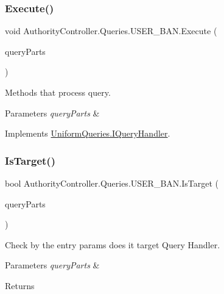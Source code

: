 \subsubsection{\texorpdfstring{Execute()}{Execute()}}
{\footnotesize\ttfamily void Authority\+Controller.\+Queries.\+U\+S\+E\+R\+\_\+\+B\+A\+N.\+Execute (\begin{DoxyParamCaption}\item[{\mbox{\hyperlink{struct_uniform_queries_1_1_query_part}{Query\+Part}} \mbox{[}$\,$\mbox{]}}]{query\+Parts }\end{DoxyParamCaption})}



Methods that process query. 


\begin{DoxyParams}{Parameters}
{\em query\+Parts} & \\
\hline
\end{DoxyParams}


Implements \mbox{\hyperlink{interface_uniform_queries_1_1_i_query_handler_a66d15db03bdd5b0caf6eef96f9b803c0}{Uniform\+Queries.\+I\+Query\+Handler}}.

\mbox{\label{class_authority_controller_1_1_queries_1_1_u_s_e_r___b_a_n_a29c898b411adc3a0edbed31cf90e007b}} 
\subsubsection{\texorpdfstring{Is\+Target()}{IsTarget()}}
{\footnotesize\ttfamily bool Authority\+Controller.\+Queries.\+U\+S\+E\+R\+\_\+\+B\+A\+N.\+Is\+Target (\begin{DoxyParamCaption}\item[{\mbox{\hyperlink{struct_uniform_queries_1_1_query_part}{Query\+Part}} \mbox{[}$\,$\mbox{]}}]{query\+Parts }\end{DoxyParamCaption})}



Check by the entry params does it target Query Handler. 


\begin{DoxyParams}{Parameters}
{\em query\+Parts} & \\
\hline
\end{DoxyParams}
\begin{DoxyReturn}{Returns}

\end{DoxyReturn}


